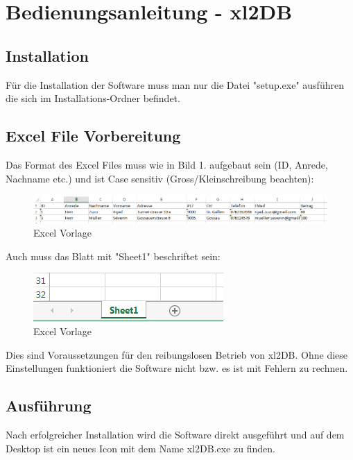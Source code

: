 \documentclass{article}
\begin{document}
\section*{\centering Bedienungsanleitung  - xl2DB}
\subsection*{Installation}
Für die Installation der Software muss man nur die Datei "setup.exe" ausführen die sich im Installations-Ordner befindet.

\subsection*{Excel File Vorbereitung}
Das Format des Excel Files muss wie in Bild 1. aufgebaut sein (ID, Anrede, Nachname etc.) und ist Case sensitiv (Gross/Kleinschreibung beachten): 
\begin{figure}[h]
	\begin{center}
		\centering
		\includegraphics[width=0.8\paperwidth]{vorlageExcel}
		\caption{Excel Vorlage}
	\end{center}
\end{figure}

Auch muss das Blatt mit "Sheet1" beschriftet sein: 
\begin{figure}[h]
	\begin{center}
		\centering
		\includegraphics[width=0.3\paperwidth]{vorlageExcelSheet1}
		\caption{Excel Vorlage}
	\end{center}
\end{figure}

Dies sind Voraussetzungen für den reibungslosen Betrieb von xl2DB. Ohne diese Einstellungen funktioniert die Software nicht bzw. es ist mit Fehlern zu rechnen.

\subsection*{Ausführung}
Nach erfolgreicher Installation wird die Software direkt ausgeführt und auf dem Desktop ist ein neues Icon mit dem Name xl2DB.exe zu finden.
\end{document}
